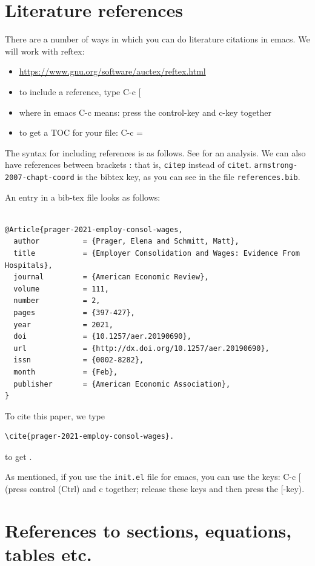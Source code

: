 \documentclass[11pt]{article}
\begin{document}
\section{Literature references}

There are a number of ways in which you can do literature citations in emacs. We will work with reftex:
\begin{itemize}
\item \url{https://www.gnu.org/software/auctex/reftex.html}
\item to include a reference, type C-c [
\item where in emacs C-c means: press the control-key and c-key together
\item to get a TOC for your file: C-c =
\end{itemize}
The syntax for including references is as follows. See \citet{armstrong-2007-chapt-coord} for an analysis. We can also have references between brackets \citep{athey-2019-machin-learn}: that is, \texttt{citep} instead of \texttt{citet}. \texttt{armstrong-2007-chapt-coord} is the bibtex key, as you can see in the file \texttt{references.bib}.

An entry in a bib-tex file looks as follows:

\begin{verbatim}

@Article{prager-2021-employ-consol-wages,
  author          = {Prager, Elena and Schmitt, Matt},
  title           = {Employer Consolidation and Wages: Evidence From Hospitals},
  journal         = {American Economic Review},
  volume          = 111,
  number          = 2,
  pages           = {397-427},
  year            = 2021,
  doi             = {10.1257/aer.20190690},
  url             = {http://dx.doi.org/10.1257/aer.20190690},
  issn            = {0002-8282},
  month           = {Feb},
  publisher       = {American Economic Association},
}
\end{verbatim}

To cite this paper, we type
\begin{verbatim}
\cite{prager-2021-employ-consol-wages}.
\end{verbatim}
to get \cite{prager-2021-employ-consol-wages}.

As mentioned, if you use the \texttt{init.el} file for emacs, you can use the keys: C-c [ (press control (Ctrl) and c together; release these keys and then press the [-key). 


\section{References to sections, equations, tables etc.}
\end{document}
